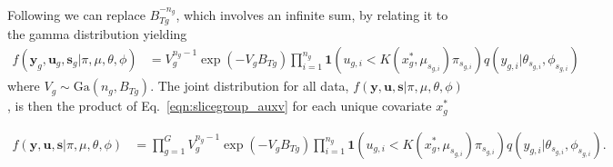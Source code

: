 \documentclass{article} %
\newcommand{\Ga}{\text{Ga}}
\newcommand{\idf}[1]{\mathbf 1 \left ( #1 \right )}
\begin{document}
Following \cite{GriffinWalker:2011,JamesLijoiPrunster:2009,FavaroTeh:2012} we can replace 
$B_{Tg}^{-n_g}$, which involves an infinite sum, by relating it to the gamma
distribution yielding
\begin{align}
  f({\mathbf y}_g, {\mathbf u}_g, {\mathbf s}_g | \pi, \mu, \theta, \phi) &=
  V_g^{n_g-1} \exp{(-V_g B_{Tg})} \prod_{i=1}^{n_g} \idf{ u_{g,i}
  < K(x^*_g,\mu_{s_{g,i}})\pi_{s_{g,i}} } q(y_{g,i} | \theta_{s_{g,i}},
  \phi_{s_{g,i}})
  \label{eqn:slicegroup_auxv}
\end{align}
where $V_g \sim \Ga(n_g,B_{Tg})$.
The joint distribution for all data, $f({\mathbf y}, {\mathbf u}, {\mathbf
s}|\pi, \mu, \theta, \phi)$, is then the product of Eq.~\ref{eqn:slicegroup_auxv}
for each unique covariate $x^*_g$

\begin{align}
  f({\mathbf y}, {\mathbf u}, {\mathbf s} | \pi, \mu, \theta, \phi) &=
  \prod_{g=1}^G V_g^{n_g-1} \exp{(-V_g B_{Tg})} \prod_{i=1}^{n_g} \idf{ u_{g,i}
  < K(x^*_g,\mu_{s_{g,i}})\pi_{s_{g,i}} } q(y_{g,i} | \theta_{s_{g,i}},
  \phi_{s_{g,i}}).
  \label{eqn:slicealmost}
\end{align}
\end{document}
